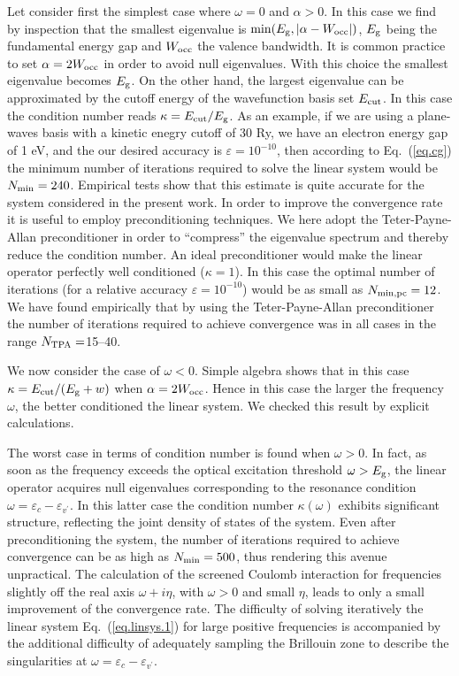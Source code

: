 \documentclass[twocolumn,prb,showpacs,superscriptaddress]{revtex4}
\def\w{\omega}
\def\E{\varepsilon}
\def\vp{{v^\prime}}
\begin{document}
Let consider first the simplest case where $\w=0$ and $\alpha>0$. In this case 
we find by inspection that the smallest eigenvalue is $\min(E_{\rm g}, |\alpha-W_{\rm occ}|)$, 
$E_{\rm g}$ being the fundamental energy gap and $W_{\rm occ}$ the valence bandwidth.
It is common practice to set $\alpha=2W_{\rm occ}$ in order to avoid null eigenvalues.
\cite{baroni.rmp} With this choice the smallest eigenvalue becomes $E_{\rm g}$.
On the other hand, the largest eigenvalue can be approximated by the
cutoff energy of the wavefunction basis set $E_{\rm cut}$.
In this case the condition number reads $\kappa = E_{\rm cut}/E_{\rm g}$.
As an example, if we are using a plane-waves basis with a kinetic enegry
cutoff of 30 Ry, we have an electron energy gap of 1 eV, 
and the our desired accuracy is $\varepsilon=10^{-10}$, then according to
Eq.\ (\ref{eq.cg}) the minimum number of iterations required to solve 
the linear system would be $N_{\rm min} = 240$. Empirical tests show that 
this estimate is quite accurate for the system considered in the present work.
In order to improve the convergence rate it is useful to employ preconditioning
techniques. We here adopt the Teter-Payne-Allan preconditioner\cite{tpa}
in order to ``compress'' the eigenvalue spectrum and thereby reduce the
condition number. An ideal preconditioner would make the linear operator
perfectly well conditioned ($\kappa=1$). In this case
the optimal  number of iterations (for a relative accuracy $\varepsilon=10^{-10}$) 
would be as small as $N_{\rm min,pc} = 12$. We have found empirically
that by using the Teter-Payne-Allan 
preconditioner the number of iterations
required to achieve convergence was in all cases in the range $N_{\rm TPA}=$15--40. 

We now consider the case of $\w<0$. Simple algebra shows that in this case
$\kappa = E_{\rm cut}/(E_{\rm g} + w)$
when $\alpha = 2W_{\rm occ}$. Hence in this case the larger the frequency $\w$,
the better conditioned the linear system. We checked this result
by explicit calculations.

The worst case in terms of condition number is found when $\w>0$. 
In fact, as soon as the frequency exceeds the optical excitation
threshold $\w>E_{\rm g}$, the linear operator acquires null eigenvalues 
corresponding to the resonance condition $\w = \E_c - \E_\vp$. 
In this latter case the condition
number $\kappa(\w)$ exhibits significant structure, reflecting
the joint density of states of the system. Even after preconditioning the system, 
the number of iterations required to achieve convergence can be as high as 
$N_{\rm min} = 500$, thus rendering this avenue unpractical.
The calculation of the screened Coulomb interaction for frequencies slightly
off the real axis $\w+i\eta$, with $\w>0$ and small $\eta$, leads to only a small
improvement of the convergence rate.
The difficulty of solving iteratively the linear system Eq.\ (\ref{eq.linsys.1})
for large positive frequencies is accompanied by the additional difficulty 
of adequately sampling the Brillouin zone to describe the singularities at $\w = \E_c - \E_\vp$.
\end{document}
